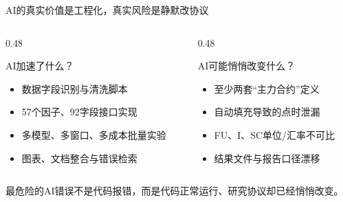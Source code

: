 \documentclass[aspectratio=169,10pt]{beamer}
\begin{document}
\begin{frame}{AI的真实价值是工程化，真实风险是静默改协议}
  \begin{columns}[T,onlytextwidth]
    \begin{column}{0.48\textwidth}
      \begin{block}{AI加速了什么？}
        \begin{itemize}
          \item 数据字段识别与清洗脚本
          \item 57个因子、92字段接口实现
          \item 多模型、多窗口、多成本批量实验
          \item 图表、文档整合与错误检索
        \end{itemize}
      \end{block}
    \end{column}
    \begin{column}{0.48\textwidth}
      \begin{alertblock}{AI可能悄悄改变什么？}
        \begin{itemize}
          \item 至少两套“主力合约”定义
          \item 自动填充导致的点时泄漏
          \item FU、I、SC单位/汇率不可比
          \item 结果文件与报告口径漂移
        \end{itemize}
      \end{alertblock}
    \end{column}
  \end{columns}
  \vfill
  \begin{takeaway}[项目经验]
    最危险的AI错误不是代码报错，而是代码正常运行、研究协议却已经悄悄改变。
  \end{takeaway}
\end{frame}
\end{document}
